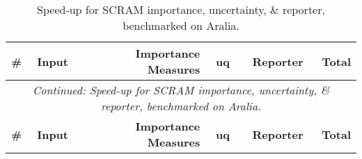 \begin{longtable}{@{}llrrrr@{}}
\caption{Speed-up for SCRAM importance, uncertainty, \& reporter, benchmarked on Aralia.}
\label{tab:improvement_runs_summary}\\
\toprule
\textbf{\#} & \textbf{Input} & \textbf{Importance Measures} & \textbf{\acrlong{uq}} & \textbf{Reporter} & \textbf{Total} \\
\midrule
\endfirsthead
\multicolumn{6}{c}{\textit{Continued: Speed-up for SCRAM importance, uncertainty, \& reporter, benchmarked on Aralia.}}\\
\toprule
\textbf{\#} & \textbf{Input} & \textbf{Importance Measures} & \textbf{\acrlong{uq}} & \textbf{Reporter} & \textbf{Total} \\
\midrule
\endhead


\end{longtable}
